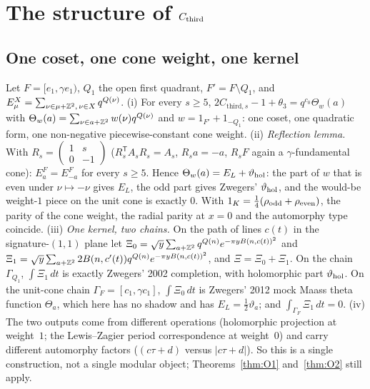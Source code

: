 \section{The structure of $C_{\mathrm{third}}$}\label{sec:cthird}
\subsection{One coset, one cone weight, one kernel}\label{sec:cthirdthm}
\begin{theorem}\label{thm:cthird}
Let $F=[e_1,\gamma e_1)$, $Q_1$ the open first quadrant, $F'=F\setminus Q_1$, and $E^X_\mu=\sum_{\nu\in\mu+\mathbb{Z}^2,\,\nu\in X}q^{Q(\nu)}$.
(i) For every $s\ge5$, $2C_{\mathrm{third},s}-1+\theta_3=q^{c_0}\Theta_w(a)$ with $\Theta_w(a)=\sum_{\nu\in a+\mathbb{Z}^2}w(\nu)q^{Q(\nu)}$ and
$w=1_{F'}+1_{-Q_1}$: one coset, one quadratic form, one non-negative piecewise-constant cone weight.
(ii) \emph{Reflection lemma.} With $R_s=\begin{pmatrix}1&s\\0&-1\end{pmatrix}$ ($R_s^{\mathsf T}A_sR_s=A_s$, $R_sa=-a$, $R_sF$ again a $\gamma$-fundamental cone):
$E^F_a=E^F_{-a}$ for every $s\ge5$. Hence $\Theta_w(a)=E_L+\vartheta_{\rm hol}$: the part of $w$ that is even under $\nu\mapsto-\nu$ gives $E_L$, the odd part gives
Zwegers' $\vartheta_{\rm hol}$, and the would-be weight-$1$ piece on the unit cone is exactly $0$. With $1_K=\tfrac14(\rho_{\rm odd}+\rho_{\rm even})$, the
parity of the cone weight, the radial parity at $x=0$ and the automorphy type coincide.
(iii) \emph{One kernel, two chains.} On the path of lines $c(t)$ in the signature-$(1,1)$ plane let
$\Xi_0=\sqrt y\sum_{a+\mathbb{Z}^2}q^{Q(n)}e^{-\pi yB(n,c(t))^2}$ and $\Xi_1=\sqrt y\sum_{a+\mathbb{Z}^2}2B(n,c'(t))q^{Q(n)}e^{-\pi yB(n,c(t))^2}$, and $\Xi=\Xi_0+\Xi_1$. On the chain
$\Gamma_{Q_1}$, $\int\Xi_1\,dt$ is exactly Zwegers' 2002 completion, with holomorphic part $\vartheta_{\rm hol}$. On the unit-cone chain $\Gamma_F=[c_1,\gamma c_1]$,
$\int\Xi_0\,dt$ is Zwegers' 2012 mock Maass theta function $\Theta_a$, which here has no shadow and has $E_L=\tfrac12\vartheta_a$; and $\int_{\Gamma_F}\Xi_1\,dt=0$.
(iv) The two outputs come from different operations (holomorphic projection at weight~$1$; the Lewis--Zagier period correspondence at weight~$0$) and carry
different automorphy factors ($(c\tau+d)$ versus $|c\tau+d|$). So this is a single construction, not a single modular object; Theorems~\ref{thm:O1} and~\ref{thm:O2} still apply.
\end{theorem}
